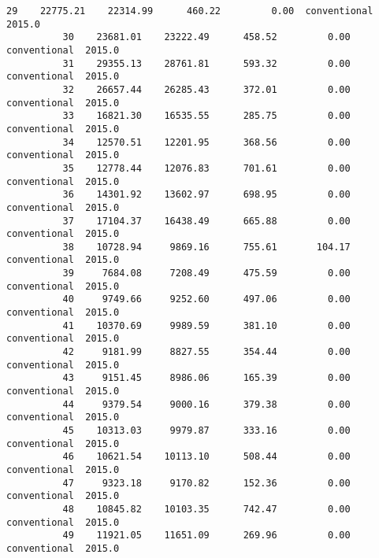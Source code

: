 \documentclass[11pt]{article}
\begin{document}
\begin{Verbatim}[commandchars=\\\{\}]
          29    22775.21    22314.99      460.22         0.00  conventional  2015.0   
          30    23681.01    23222.49      458.52         0.00  conventional  2015.0   
          31    29355.13    28761.81      593.32         0.00  conventional  2015.0   
          32    26657.44    26285.43      372.01         0.00  conventional  2015.0   
          33    16821.30    16535.55      285.75         0.00  conventional  2015.0   
          34    12570.51    12201.95      368.56         0.00  conventional  2015.0   
          35    12778.44    12076.83      701.61         0.00  conventional  2015.0   
          36    14301.92    13602.97      698.95         0.00  conventional  2015.0   
          37    17104.37    16438.49      665.88         0.00  conventional  2015.0   
          38    10728.94     9869.16      755.61       104.17  conventional  2015.0   
          39     7684.08     7208.49      475.59         0.00  conventional  2015.0   
          40     9749.66     9252.60      497.06         0.00  conventional  2015.0   
          41    10370.69     9989.59      381.10         0.00  conventional  2015.0   
          42     9181.99     8827.55      354.44         0.00  conventional  2015.0   
          43     9151.45     8986.06      165.39         0.00  conventional  2015.0   
          44     9379.54     9000.16      379.38         0.00  conventional  2015.0   
          45    10313.03     9979.87      333.16         0.00  conventional  2015.0   
          46    10621.54    10113.10      508.44         0.00  conventional  2015.0   
          47     9323.18     9170.82      152.36         0.00  conventional  2015.0   
          48    10845.82    10103.35      742.47         0.00  conventional  2015.0   
          49    11921.05    11651.09      269.96         0.00  conventional  2015.0   
          

\end{Verbatim}
\end{document}
